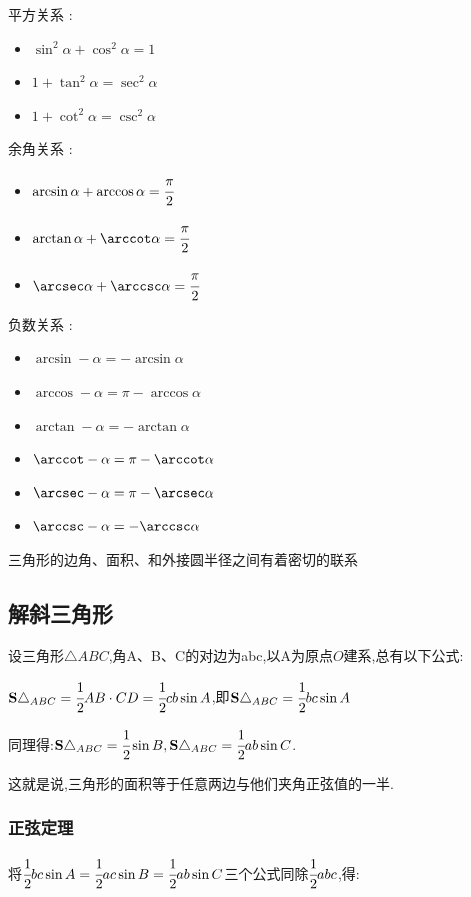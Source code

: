 {{  平方关系 :
  \begin{itemize}
    \item $\sin^2\alpha + \cos^2\alpha = 1$
    \item $1 + \tan^2\alpha = \sec^2\alpha$
    \item $1 + \cot^2\alpha = \csc^2\alpha$
  \end{itemize}

  余角关系 :
  \begin{itemize}
    \item $\arcsin\alpha + \arccos\alpha = \cfrac{\pi}{2}$
    \item $\arctan\alpha + \arccot\alpha = \cfrac{\pi}{2}$
    \item $\arcsec\alpha + \arccsc\alpha = \cfrac{\pi}{2}$
  \end{itemize}

  负数关系 :
  \begin{itemize}
    \item $\arcsin-\alpha = -\arcsin\alpha$
    \item $\arccos-\alpha = \pi - \arccos\alpha$
    \item $\arctan-\alpha = -\arctan\alpha$
    \item $\arccot-\alpha = \pi - \arccot\alpha$
    \item $\arcsec-\alpha = \pi - \arcsec\alpha$
    \item $\arccsc-\alpha = -\arccsc\alpha$
  \end{itemize}

}%

三角形的边角、面积、和外接圆半径之间有着密切的联系

\subsection{解斜三角形}{
设三角形$\triangle ABC$,角A、B、C的对边为abc,以A为原点$O$建系,总有以下公式:

$\mathbf{S}\triangle_{ABC} = \cfrac{1}{2}AB \cdot CD = \cfrac{1}{2}cb\sin A$,即$\mathbf{S}\triangle_{ABC} = \cfrac{1}{2}bc\sin A$

同理得:$\mathbf{S}\triangle_{ABC} = \cfrac{1}{2}\sin B, \mathbf{S}\triangle_{ABC} = \cfrac{1}{2}ab\sin C$.

这就是说,三角形的面积等于任意两边与他们夹角正弦值的一半.

\subsubsection{正弦定理}
将$\cfrac{1}{2}bc\sin A = \cfrac{1}{2}ac\sin B = \cfrac{1}{2}ab\sin C$三个公式同除$\cfrac{1}{2}abc$,得:

}}
